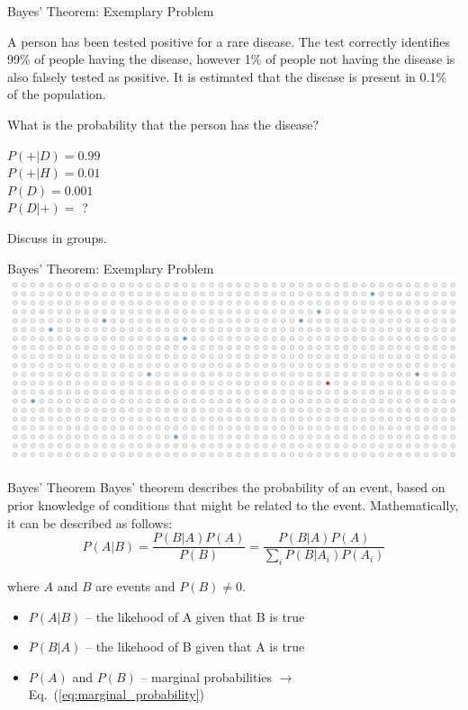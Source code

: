 \begin{frame}{Bayes' Theorem: Exemplary Problem}
    \begin{example}
        \medskip    
        A person has been tested positive for a rare disease. The test correctly identifies 99\% of people having the disease, however 1\% of people not having the disease is also falsely tested as positive. It is estimated that the disease is present in 0.1\% of the population.
        
        What is the probability that the person has the disease?
        
        $P(+|D) = 0.99$\\
        $P(+|H) = 0.01$\\
        $P(D) = 0.001$\\
        $P(D|+) =$ ?
        
        Discuss in groups.
    \end{example}
\end{frame}

\begin{frame}{Bayes' Theorem: Exemplary Problem}
    \includegraphics[width=\linewidth]{gfx/dots_disease}
\end{frame}

\begin{frame}{Bayes' Theorem}
    Bayes' theorem describes the probability of an event, based on prior knowledge of conditions that might be related to the event. Mathematically, it can be described as follows:
    \begin{equation}
    P(A|B) = \frac{P(B|A)P(A)}{P(B)} = \frac{P(B|A) P(A)}{\sum_{i} P(B|A_i)P(A_i)}
    \end{equation}
    
    where $A$ and $B$ are events and $P(B) \neq 0$.
    
    \begin{itemize}
        \item $P(A|B)$ -- the likehood of A given that B is true
        \item $P(B|A)$ -- the likehood of B given that A is true
        \item $P(A)$ and $P(B)$ -- marginal probabilities $\rightarrow$ Eq.~(\ref{eq:marginal_probability})
    \end{itemize}
\end{frame}

